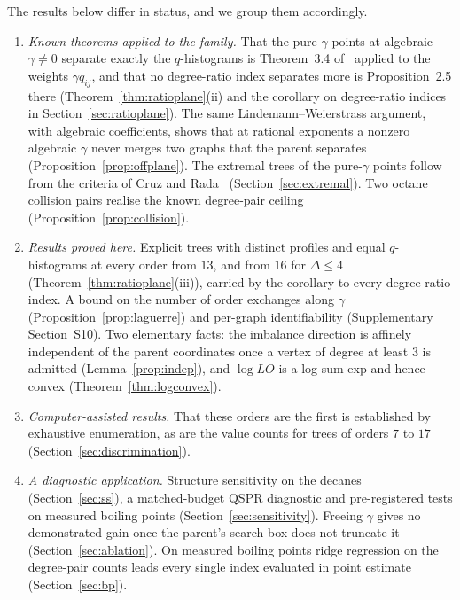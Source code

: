 \documentclass[a5paper, 10pt]{article}
\theoremstyle{plain}
\theoremstyle{remark}
\theoremstyle{definition}
\begin{document}
  The results below differ in status, and we group them accordingly.
  \begin{enumerate}
  \item[(i)] \emph{Known theorems applied to the family.} That the
  pure-$\gamma$ points at algebraic $\gamma \neq 0$ separate exactly the
  $q$-histograms is Theorem~3.4 of~\cite{Rada2019ExpVDB} applied to the
  weights $\gamma q_{ij}$, and that no degree-ratio index separates more
  is Proposition~2.5 there (Theorem~\ref{thm:ratioplane}(ii) and the corollary on degree-ratio
  indices in Section~\ref{sec:ratioplane}). The same Lindemann--Weierstrass
  argument, with algebraic coefficients, shows that at rational exponents
  a nonzero algebraic $\gamma$ never merges two graphs that the parent
  separates (Proposition~\ref{prop:offplane}). The extremal trees of the
  pure-$\gamma$ points follow from the criteria of Cruz and
  Rada~\cite{CruzRada2019PathStar} (Section~\ref{sec:extremal}). Two
  octane collision pairs realise the known degree-pair
  ceiling~\cite[Section~3.1]{Rada2026LinearVDB}
  (Proposition~\ref{prop:collision}).
  \item[(ii)] \emph{Results proved here.} Explicit trees with distinct
  profiles and equal $q$-histograms at every order from $13$, and
  from $16$ for $\Delta \le 4$ (Theorem~\ref{thm:ratioplane}(iii)), carried
  by the corollary to every degree-ratio index. A bound on the number of
  order exchanges along $\gamma$ (Proposition~\ref{prop:laguerre}) and
  per-graph identifiability (Supplementary Section~S10). Two elementary facts: the imbalance
  direction is affinely independent of the parent coordinates once a
  vertex of degree at least $3$ is admitted (Lemma~\ref{prop:indep}), and
  $\log LO$ is a log-sum-exp and hence convex
  (Theorem~\ref{thm:logconvex}).
  \item[(iii)] \emph{Computer-assisted results.} That these orders are
  the first is established by exhaustive enumeration, as are the value
  counts for trees of orders $7$ to $17$ (Section~\ref{sec:discrimination}).
  \item[(iv)] \emph{A diagnostic application.} Structure sensitivity on
  the decanes (Section~\ref{sec:ss}), a matched-budget QSPR diagnostic and
  pre-registered tests on measured boiling points
  (Section~\ref{sec:sensitivity}). Freeing $\gamma$ gives no demonstrated
  gain once the parent's search box does not truncate it
  (Section~\ref{sec:ablation}). On measured boiling points ridge
  regression on the degree-pair counts leads every single index evaluated
  in point estimate (Section~\ref{sec:bp}).
  \end{enumerate}
\end{document}
